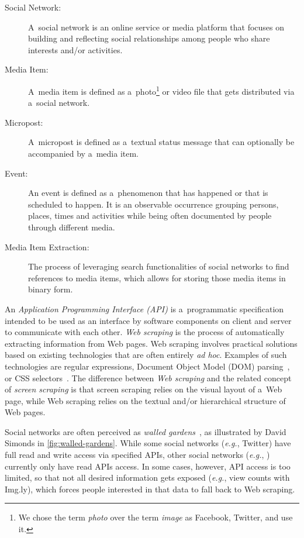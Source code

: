 \begin{description}
  \item[Social Network:]
       A~social network is an online service or media platform
       that focuses on building and reflecting
       social relationships among people
       who share interests and/or activities.
  \item[Media Item:]
       A~media item is defined as
       a~photo\footnote{We chose the term \emph{photo}
       over the term \emph{image} as 
       Facebook, Twitter, and \googleplus use it.}
       or video
       file that gets distributed via a~social network.
  \item[Micropost:]
       A~micropost is defined as a~textual status message
       that can optionally be accompanied by a~media item.
  \item[Event:]
       An event is defined as a~phenomenon that has happened
       or that is scheduled to happen.
       It is an observable occurrence grouping persons,
       places, times and activities while being often
       documented by people through different media.
  \item[Media Item Extraction:]
       The process of leveraging search functionalities of
       social networks to find references to media items,
       which allows for storing those media items in binary form.       
\end{description}

An \emph{Application Programming Interface (API)}
is a~programmatic specification intended to be used
as an interface by software components on client and server
to communicate with each other.
\emph{Web scraping} is the process of
automatically extracting information from Web pages.
Web scraping involves practical solutions based on
existing technologies that are often entirely \emph{ad hoc}.
Examples of such technologies are regular expressions,
Document Object Model (DOM)
parsing~\cite{lehors2004dom},
or CSS selectors~\cite{hunt2012cssselectors}.
The difference between \emph{Web scraping}
and the related concept of \emph{screen scraping}
is that screen scraping relies on the visual layout of a~Web page,
while Web scraping relies on the textual
and/or hierarchical structure of Web pages.

Social networks are often perceived as
\emph{walled gardens}~\cite{simonds2008walledgarden},
as illustrated by David Simonds in \autoref{fig:walled-gardens}.
While some social networks (\emph{e.g.}, Twitter)
have full read and write access via specified APIs,
other social networks (\emph{e.g.}, \googleplus)
currently only have read APIs access.
In some cases, however, API access is too limited,
so that not all desired information gets exposed
(\emph{e.g.}, view counts with Img.ly),
which forces people interested in that data
to fall back to Web scraping.

